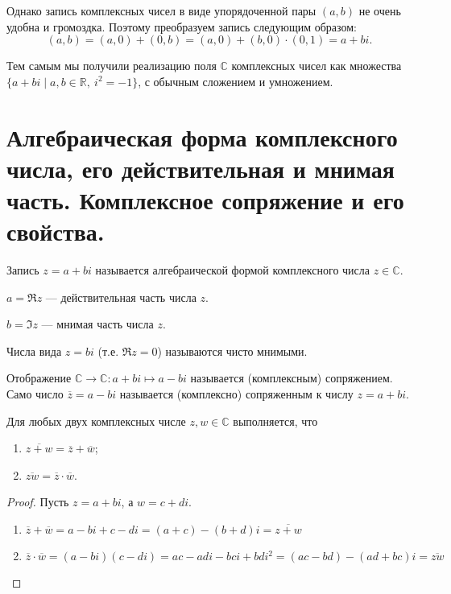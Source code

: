 Однако запись комплексных чисел в виде упорядоченной пары $(a, b)$ не очень удобна и громоздка. Поэтому преобразуем запись следующим образом:
\[
(a, b) = (a, 0) + (0, b) = (a, 0) + (b, 0) \cdot (0, 1) = a + bi.
\]

Тем самым мы получили реализацию поля $\mathbb{C}$ комплексных чисел как множества \\ $\{a + bi \mid a, b \in \mathbb{R},\ i^2 = -1\}$, с обычным сложением и умножением.

\section{Алгебраическая форма комплексного числа, его действительная и мнимая часть. Комплексное сопряжение и его свойства.}

\begin{Def}
Запись $z = a + bi$ называется алгебраической формой комплексного числа $z \in \mathbb{C}$.


$a = \Re z$ — действительная часть числа $z$.


$b = \Im z$ — мнимая часть числа $z$.
\end{Def}

\begin{Def}
Числа вида $z = bi$ (т.е. $\Re z = 0$) называются чисто мнимыми.
\end{Def}

\begin{Def}
Отображение $\mathbb{C} \rightarrow \mathbb{C} : a + bi \mapsto a - bi$ называется (комплексным) сопряжением. Само число $\overline{z} = a - bi$ называется (комплексно) сопряженным к числу $z = a + bi$. 
\end{Def}

\begin{Lemma}
Для любых двух комплексных числе $z, w \in \mathbb{C}$ выполняется, что
\begin{enumerate}
\item $\overline{z + w} = \overline{z} + \overline{w}$;
\item $\overline{zw} = \overline{z} \cdot \overline{w}$.
\end{enumerate}
\end{Lemma}

\begin{proof}
Пусть $z = a + bi$, а $w = c + di$. 
\begin{enumerate}
\item $\overline{z} + \overline{w} = a - bi + c - di = (a + c) - (b + d)i = \overline{z+ w}$
\item $\overline{z} \cdot \overline{w} = (a - bi)(c - di) = ac - adi - bci + bdi^2 = (ac - bd) - (ad + bc)i = \overline{zw}$
\end{enumerate}
\end{proof}

